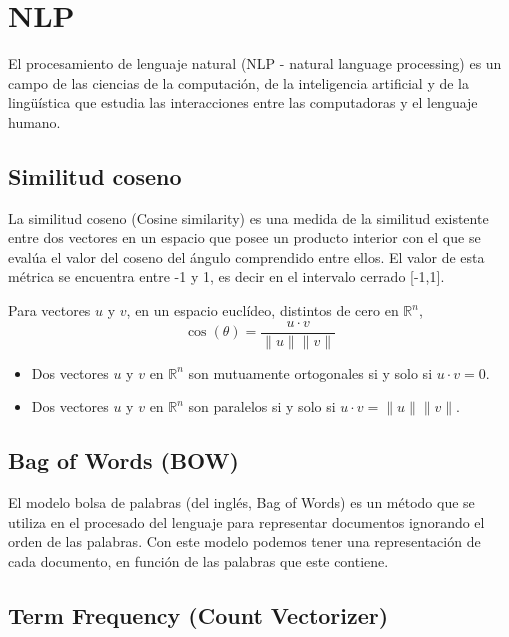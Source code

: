 \documentclass[../main.tex]{subfiles}
\begin{document}
\section{NLP}
    El procesamiento de lenguaje natural (NLP - natural language processing) es un campo de las ciencias de la computación, de la inteligencia artificial y de la lingüística que estudia las interacciones entre las computadoras y el lenguaje humano.


    \subsection{Similitud coseno}
        La similitud coseno (Cosine similarity) es una medida de la similitud existente entre dos vectores en un espacio que posee un producto interior con el que se evalúa el valor del coseno del ángulo comprendido entre ellos. 
        El valor de esta métrica se encuentra entre -1 y 1, es decir en el intervalo cerrado [-1,1].

        \begin{definition}
            Para vectores $u$ y $v$, en un espacio euclídeo, distintos de cero en $\mathbb{R}^n$,
            \begin{equation}
                \cos(\theta) = \frac{u \cdot v}{\|u\| \|v\|}
            \end{equation}
        \end{definition}

        \begin{itemize}
            \item Dos vectores $u$ y $v$ en $\mathbb{R}^n$ son mutuamente ortogonales si y solo si $u \cdot v = 0$.
            \item Dos vectores $u$ y $v$ en $\mathbb{R}^n$ son paralelos si y solo si $u \cdot v = \|u\| \|v\|$.
        \end{itemize}

    \subsection{Bag of Words (BOW)}
        El modelo bolsa de palabras (del inglés, Bag of Words) es un método que se utiliza en el procesado del lenguaje para representar documentos ignorando el orden de las palabras. Con este modelo podemos tener una representación de cada documento, en función de las palabras que este contiene.


    \subsection{Term Frequency (Count Vectorizer)}
        
\end{document}
